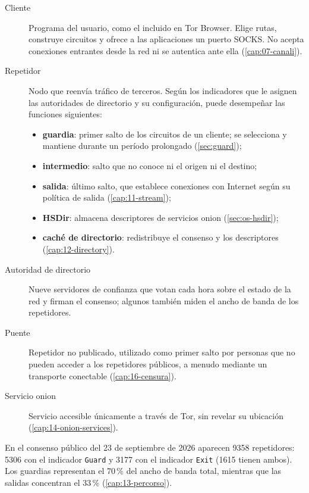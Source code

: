 \begin{description}
  \item[Cliente] Programa del usuario, como el incluido en Tor Browser. Elige rutas, construye circuitos y ofrece a las aplicaciones un puerto SOCKS. No acepta conexiones entrantes desde la red ni se autentica ante ella (\cref{cap:07-canali}).
  \item[Repetidor] Nodo que reenvía tráfico de terceros. Según los indicadores que le asignen las autoridades de directorio y su configuración, puede desempeñar las funciones siguientes:
  \begin{itemize}
    \item \textbf{guardia}: primer salto de los circuitos de un cliente; se selecciona y mantiene durante un período prolongado (\cref{sec:guard});
    \item \textbf{intermedio}: salto que no conoce ni el origen ni el destino;
    \item \textbf{salida}: último salto, que establece conexiones con Internet según su política de salida (\cref{cap:11-stream});
    \item \textbf{HSDir}: almacena descriptores de servicios onion (\cref{sec:os-hsdir});
    \item \textbf{caché de directorio}: redistribuye el consenso y los descriptores (\cref{cap:12-directory}).
  \end{itemize}
  \item[Autoridad de directorio] Nueve servidores de confianza que votan cada hora sobre el estado de la red y firman el consenso; algunos también miden el ancho de banda de los repetidores.
  \item[Puente] Repetidor no publicado, utilizado como primer salto por personas que no pueden acceder a los repetidores públicos, a menudo mediante un transporte conectable (\cref{cap:16-censura}).
  \item[Servicio onion] Servicio accesible únicamente a través de Tor, sin revelar su ubicación (\cref{cap:14-onion-services}).
\end{description}

En el consenso público del 23 de septiembre de 2026 aparecen 9358 repetidores: 5306 con el indicador \texttt{Guard} y 3177 con el indicador \texttt{Exit} (1615 tienen ambos). Los guardias representan el 70\,\% del ancho de banda total, mientras que las salidas concentran el 33\,\% (\cref{cap:13-percorso}).


